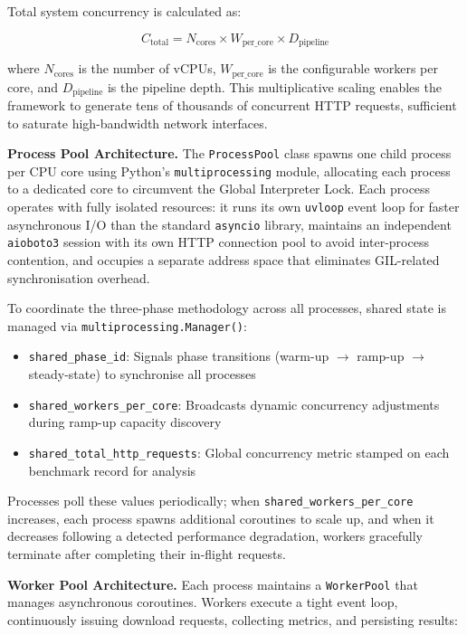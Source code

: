 Total system concurrency is calculated as:

\begin{equation}
C_{\text{total}} = N_{\text{cores}} \times W_{\text{per\_core}} \times D_{\text{pipeline}}
\end{equation}

where $N_{\text{cores}}$ is the number of vCPUs, $W_{\text{per\_core}}$ is the configurable workers per core, and $D_{\text{pipeline}}$ is the pipeline depth. This multiplicative scaling enables the framework to generate tens of thousands of concurrent HTTP requests, sufficient to saturate high-bandwidth network interfaces.

\textbf{Process Pool Architecture.} The \texttt{ProcessPool} class spawns one child process per CPU core using Python's \texttt{multiprocessing} module, allocating each process to a dedicated core to circumvent the Global Interpreter Lock. Each process operates with fully isolated resources: it runs its own \texttt{uvloop} event loop for faster asynchronous I/O than the standard \texttt{asyncio} library, maintains an independent \texttt{aioboto3} session with its own HTTP connection pool to avoid inter-process contention, and occupies a separate address space that eliminates GIL-related synchronisation overhead.

To coordinate the three-phase methodology across all processes, shared state is managed via \texttt{multiprocessing.Manager()}:

\begin{itemize}
    \item \texttt{shared\_phase\_id}: Signals phase transitions (warm-up $\to$ ramp-up $\to$ steady-state) to synchronise all processes
    \item \texttt{shared\_workers\_per\_core}: Broadcasts dynamic concurrency adjustments during ramp-up capacity discovery
    \item \texttt{shared\_total\_http\_requests}: Global concurrency metric stamped on each benchmark record for analysis
\end{itemize}

Processes poll these values periodically; when \texttt{shared\_workers\_per\_core} increases, each process spawns additional coroutines to scale up, and when it decreases following a detected performance degradation, workers gracefully terminate after completing their in-flight requests.

\textbf{Worker Pool Architecture.} Each process maintains a \texttt{WorkerPool} that manages asynchronous coroutines. Workers execute a tight event loop, continuously issuing download requests, collecting metrics, and persisting results:

